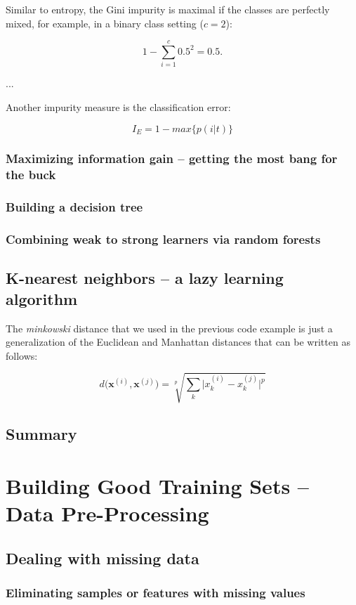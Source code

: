\documentclass[letterpaper]{report}
\begin{document}
Similar to entropy, the Gini impurity is maximal if the classes are perfectly mixed, for example, in a binary class setting ($c = 2 $):

\[
1 - \sum_{i=1}^{c} 0.5^2 = 0.5.
\]

...

Another impurity measure is the classification error:

\[
I_E = 1 - max \{ p(i|t) \}
\]

\subsection{Maximizing information gain -- getting the most bang for the buck}
\subsection{Building a decision tree}
\subsection{Combining weak to strong learners via random forests}
\section{K-nearest neighbors -- a lazy learning algorithm}

The \textit{minkowski} distance that we used in the previous code example is just a generalization of the Euclidean and Manhattan distances that can be written as follows:

\[
d \big(\mathbf{x}^{(i)}, \mathbf{x}^{(j)}\big) =  \sqrt[p]{\sum_k \big| x_{k}^{(i)} - x_{k}^{(j)} \big|^p } 
\]


\section{Summary}






\chapter{Building Good Training Sets -- Data Pre-Processing}

\section{Dealing with missing data}
\subsection{Eliminating samples or features with missing values}
\end{document}
